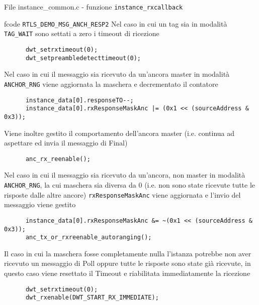 \begin{frame}[fragile, shrink=50]{File instance\_common.c - funzione \lstinline!instance_rxcallback!}
  \begin{block}{fcode \lstinline!RTLS_DEMO_MSG_ANCH_RESP2!}
    Nel caso in cui un tag sia in modalità \lstinline!TAG_WAIT! sono settati a zero i timeout di ricezione
    \begin{lstlisting}
      dwt_setrxtimeout(0);
      dwt_setpreambledetecttimeout(0);
    \end{lstlisting}
    Nel caso in cui il messaggio sia ricevuto da un'ancora \alert{master} in modalità \lstinline!ANCHOR_RNG! viene aggiornata la maschera
    e decrementato il contatore
    \begin{lstlisting}
      instance_data[0].responseTO--;
      instance_data[0].rxResponseMaskAnc |= (0x1 << (sourceAddress & 0x3));
    \end{lstlisting}
    Viene inoltre gestito il comportamento dell'ancora \alert{master} (i.e. continua ad aspettare ed invia il messaggio di Final)
    \begin{lstlisting}
      anc_rx_reenable();
    \end{lstlisting}
    Nel caso in cui il messaggio sia ricevuto da un'ancora, \alert{non} master in modalità \lstinline!ANCHOR_RNG!, la cui maschera sia
    diversa da $0$ (i.e. non sono state ricevute tutte le risposte dalle altre ancore) \lstinline!rxResponseMaskAnc! viene aggiornata e l'invio del
    messaggio viene gestito
    \begin{lstlisting}
      instance_data[0].rxResponseMaskAnc &= ~(0x1 << (sourceAddress & 0x3));
      anc_tx_or_rxreenable_autoranging();
    \end{lstlisting}
    Il caso in cui la maschera fosse completamente nulla l'istanza potrebbe non aver ricevuto un messaggio di Poll oppure tutte le risposte sono state già
    ricevute, in questo caso viene resettato il Timeout e riabilitata immediatamente la ricezione
    \begin{lstlisting}
      dwt_setrxtimeout(0);
      dwt_rxenable(DWT_START_RX_IMMEDIATE);
    \end{lstlisting}
  \end{block}
\end{frame}

